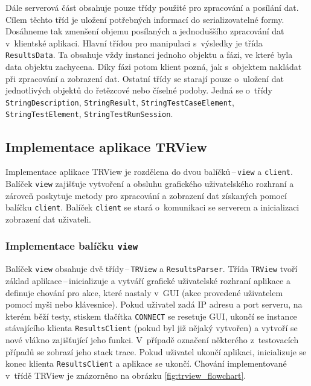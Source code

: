 	Dále serverová část obsahuje pouze třídy použité pro zpracování a posílání dat. Cílem těchto tříd je uložení potřebných informací do serializovatelné formy. Dosáhneme tak zmenšení objemu posílaných a jednoduššího zpracování dat v~klientské aplikaci. Hlavní třídou pro manipulaci s~výsledky je třída \texttt{ResultsData}. Ta obsahuje vždy instanci jednoho objektu a fázi, ve které byla data objektu zachycena. Díky fázi potom klient pozná, jak s~objektem nakládat při zpracování a zobrazení dat. Ostatní třídy se starají pouze o~uložení dat jednotlivých objektů do řetězcové nebo číselné podoby. Jedná se o~třídy \texttt{StringDescription}, \texttt{StringResult}, \texttt{StringTestCaseElement}, \texttt{StringTestElement}, \texttt{StringTestRunSession}.

    \subsection{Implementace aplikace TRView}
    Implementace aplikace TRView je rozdělena do dvou balíčků\,--\,\texttt{view} a \texttt{client}. Balíček \texttt{view} zajišťuje vytvoření a obsluhu grafického uživatelského rozhraní a zároveň poskytuje metody pro zpracování a zobrazení dat získaných pomocí balíčku \texttt{client}. Balíček \texttt{client} se stará o~komunikaci se serverem a inicializaci zobrazení dat uživateli. 
    
      \subsubsection{Implementace balíčku \texttt{view}}
      Balíček \texttt{view} obsahuje dvě třídy\,--\,\texttt{TRView} a \texttt{ResultsParser}. Třída \texttt{TRView} tvoří základ aplikace\,--\,inicializuje a vytváří grafické uživatelské rozhraní aplikace a definuje chování pro akce, které nastaly v~GUI (akce provedené uživatelem pomocí myši nebo klávesnice). Pokud uživatel zadá IP adresu a port serveru, na kterém běží testy, stiskem tlačítka \texttt{CONNECT} se resetuje GUI, ukončí se instance stávajícího klienta \texttt{ResultsClient} (pokud byl již nějaký vytvořen) a vytvoří se nové vlákno zajišťující jeho funkci. V~případě označení některého z~testovacích případů se zobrazí jeho stack trace. Pokud uživatel ukončí aplikaci, inicializuje se konec klienta \texttt{ResultsClient} a aplikace se ukončí. Chování implementované v~třídě TRView je znázorněno na obrázku \ref{fig:trview_flowchart}.\\
      
